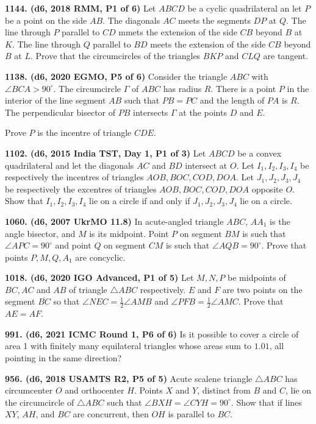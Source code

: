 \documentclass{article}
\begin{document}
\textbf{1144. (\color{red}d6\color{black}, 2018 RMM, P1 of 6)} Let $ABCD$ be a cyclic quadrilateral an let $P$ be a point on the side $AB.$ The diagonals $AC$ meets the segments $DP$ at $Q.$ The line through $P$ parallel to $CD$ mmets the extension of the side $CB$ beyond $B$ at $K.$ The line through $Q$ parallel to $BD$ meets the extension of the side $CB$ beyond $B$ at $L.$ Prove that the circumcircles of the triangles $BKP$ and $CLQ$ are tangent.

\textbf{1138. (\color{red}d6\color{black}, 2020 EGMO, P5 of 6)} Consider the triangle $ABC$ with $\angle BCA > 90^{\circ}$. The circumcircle $\Gamma$ of $ABC$ has radius $R$. There is a point $P$ in the interior of the line segment $AB$ such that $PB = PC$ and the length of $PA$ is $R$. The perpendicular bisector of $PB$ intersects $\Gamma$ at the points $D$ and $E$.

Prove $P$ is the incentre of triangle $CDE$.

\textbf{1102. (\color{red}d6\color{black}, 2015 India TST, Day 1, P1 of 3)} Let $ABCD$ be a convex quadrilateral and let the diagonals $AC$ and $BD$ intersect at $O$. Let $I_1, I_2, I_3, I_4$ be respectively the incentres of triangles $AOB, BOC, COD, DOA$. Let $J_1, J_2, J_3, J_4$ be respectively the excentres of triangles $AOB, BOC, COD, DOA$ opposite $O$. Show that $I_1, I_2, I_3, I_4$ lie on a circle if and only if $J_1, J_2, J_3, J_4$ lie on a circle.

\textbf{1060. (\color{red}d6\color{black}, 2007 UkrMO 11.8)} In acute-angled triangle $ABC$, $AA_1$ is the angle bisector, and $M$ is its midpoint. Point $P$ on segment $BM$ is such that $\angle APC = 90 ^\circ$ and point $Q$ on segment $CM$ is such that $\angle AQB = 90 ^\circ$. Prove that points $P , M , Q, A_1$ are concyclic.

\textbf{1018. (\color{red}d6\color{black}, 2020 IGO Advanced, P1 of 5)} Let $M,N,P$ be midpoints of $BC,AC$ and $AB$ of triangle $\triangle ABC$ respectively. $E$ and $F$ are two points on the segment $\overline{BC}$ so that $\angle NEC = \frac{1}{2} \angle AMB$ and $\angle PFB = \frac{1}{2} \angle AMC$. Prove that $AE=AF$.

\textbf{991. (\color{red}d6\color{black}, 2021 ICMC Round 1, P6 of 6)} Is it possible to cover a circle of area 1 with finitely many equilateral triangles whose areas sum to $1.01$, all pointing in the same direction?

\textbf{956. (\color{red}d6\color{black}, 2018 USAMTS R2, P5 of 5)} Acute scalene triangle $\triangle{}ABC$ has circumcenter $O$ and orthocenter $H$. Points $X$ and $Y$, distinct from $B$ and $C$, lie on the circumcircle of $\triangle{}ABC$ such that $\angle{}BXH=\angle{}CYH=90^{\circ{}}$. Show that if lines $XY$, $AH$, and $BC$ are concurrent, then $OH$ is parallel to $BC$.
\end{document}
